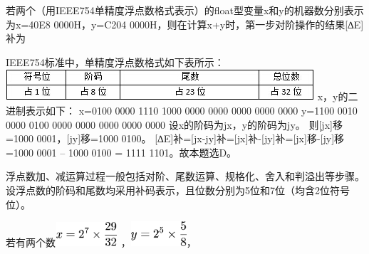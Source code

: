 \question 若两个（用IEEE754单精度浮点数格式表示）的float型变量x和y的机器数分别表示为x=40E8
0000H，y=C204 0000H，则在计算x+y时，第一步对阶操作的结果{[}∆E{]}补为
\par{}
\begin{solution}IEEE754标准中，单精度浮点数格式如下表所示：
\includegraphics[width=4.51042in,height=0.45833in]{computerassets/48bfebac1b77986c4d0a719a76fe50e4.jpeg}
x，y的二进制表示如下： x=0100 0000 1110 1000 0000 0000 0000 0000 0000
y=1100 0010 0000 0100 0000 0000 0000 0000 0000
设x的阶码为jx，y的阶码为jy。 则{[}jx{]}移=1000 0001，{[}jy{]}移=1000
0100。
{[}∆E{]}补={[}jx-jy{]}补={[}jx{]}补-{[}jy{]}补={[}jx{]}移-{[}jy{]}移=1000
0001 -- 1000 0100 = 1111 1101。故本题选D。
\end{solution}
\question 浮点数加、减运算过程一般包括对阶、尾数运算、规格化、舍入和判溢出等步骤。设浮点数的阶码和尾数均采用补码表示，且位数分别为5位和7位（均含2位符号位）。

若有两个数\includegraphics[width=0.90625in,height=0.35417in]{texmath/7c2c145Cdpi7B3507Dx3D25E75Ctimes5Cfrac7B297D7B327D}
，\includegraphics[width=0.81250in,height=0.36458in]{texmath/787c195Cdpi7B3507Dy3D25E55Ctimes5Cfrac7B57D7B87D}，

